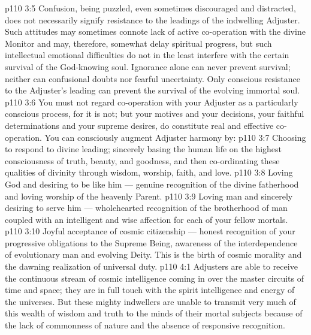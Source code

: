 \vs p110 3:5 \pc Confusion, being puzzled, even sometimes discouraged and distracted, does not necessarily signify resistance to the leadings of the indwelling Adjuster. Such attitudes may sometimes connote lack of active co\hyp{}operation with the divine Monitor and may, therefore, somewhat delay spiritual progress, but such intellectual emotional difficulties do not in the least interfere with the certain survival of the God\hyp{}knowing soul. Ignorance alone can never prevent survival; neither can confusional doubts nor fearful uncertainty. Only conscious resistance to the Adjuster’s leading can prevent the survival of the evolving immortal soul.
\vs p110 3:6 You must not regard co\hyp{}operation with your Adjuster as a particularly conscious process, for it is not; but your motives and your decisions, your faithful determinations and your supreme desires, do constitute real and effective co\hyp{}operation. You can consciously augment Adjuster harmony by:
\vs p110 3:7 \bibnobreakspace Choosing to respond to divine leading; sincerely basing the human life on the highest consciousness of truth, beauty, and goodness, and then co\hyp{}ordinating these qualities of divinity through wisdom, worship, faith, and love.
\vs p110 3:8 \bibnobreakspace Loving God and desiring to be like him --- genuine recognition of the divine fatherhood and loving worship of the heavenly Parent.
\vs p110 3:9 \bibnobreakspace Loving man and sincerely desiring to serve him --- wholehearted recognition of the brotherhood of man coupled with an intelligent and wise affection for each of your fellow mortals.
\vs p110 3:10 \bibnobreakspace Joyful acceptance of cosmic citizenship --- honest recognition of your progressive obligations to the Supreme Being, awareness of the interdependence of evolutionary man and evolving Deity. This is the birth of cosmic morality and the dawning realization of universal duty.
\vs p110 4:1 Adjusters are able to receive the continuous stream of cosmic intelligence coming in over the master circuits of time and space; they are in full touch with the spirit intelligence and energy of the universes. But these mighty indwellers are unable to transmit very much of this wealth of wisdom and truth to the minds of their mortal subjects because of the lack of commonness of nature and the absence of responsive recognition.
